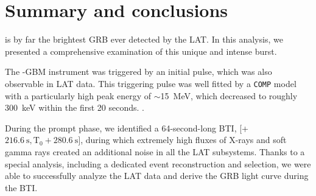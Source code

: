 \documentclass[preprint]{aastex631}
\newcommand\rg[1]{{\color{seagreen}[[[RG: #1]]]}} %
\newcommand\gmd[1]{{\color{teal}[[[GMD: #1]]]}} %
\begin{document}







\section{Summary and conclusions}
\label{sec:conclusion}
%
\grb is by far the brightest GRB ever detected by the LAT. In this analysis, we presented a comprehensive examination of this unique and intense burst.

The \Fermi-GBM instrument was triggered by an initial pulse, which was also observable in LAT data. This triggering pulse was well fitted by a \texttt{COMP} model with a particularly high peak energy of $\sim$15~MeV, which decreased to roughly 300~keV within the first 20 seconds. .

During the prompt phase, we identified a 64-second-long BTI, [\trig + $ 216.6~\mathrm{s},\mathrm{T}_0+280.6~\mathrm{s}]$, during which extremely high fluxes of X-rays and soft gamma rays created an  additional noise in all the LAT subsystems. Thanks to a special analysis, including a dedicated event reconstruction and selection, we were able to successfully analyze the LAT data and derive the GRB light curve during the BTI. 
\end{document}

